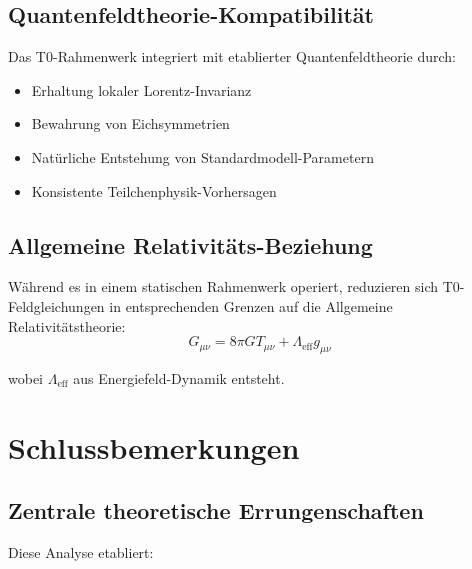 \documentclass[12pt,a4paper]{article}
\begin{document}
	\subsection{Quantenfeldtheorie-Kompatibilit\"at}
	\label{subsec:qft_compatibility}
	
	Das T0-Rahmenwerk integriert mit etablierter Quantenfeldtheorie durch:
	\begin{itemize}
		\item Erhaltung lokaler Lorentz-Invarianz
		\item Bewahrung von Eichsymmetrien
		\item Nat\"urliche Entstehung von Standardmodell-Parametern
		\item Konsistente Teilchenphysik-Vorhersagen
	\end{itemize}
	
	\subsection{Allgemeine Relativit\"ats-Beziehung}
	\label{subsec:gr_relationship}
	
	W\"ahrend es in einem statischen Rahmenwerk operiert, reduzieren sich T0-Feldgleichungen in entsprechenden Grenzen auf die Allgemeine Relativit\"atstheorie:
	\begin{equation}
		G_{\mu\nu} = 8\pi G T_{\mu\nu} + \Lambda_{\text{eff}} g_{\mu\nu}
	\end{equation}
	
	wobei $\Lambda_{\text{eff}}$ aus Energiefeld-Dynamik entsteht.
	
	\section{Schlussbemerkungen}
	\label{sec:conclusions}
	
	\subsection{Zentrale theoretische Errungenschaften}
	\label{subsec:key_achievements}
	
	Diese Analyse etabliert:
	
\end{document}
